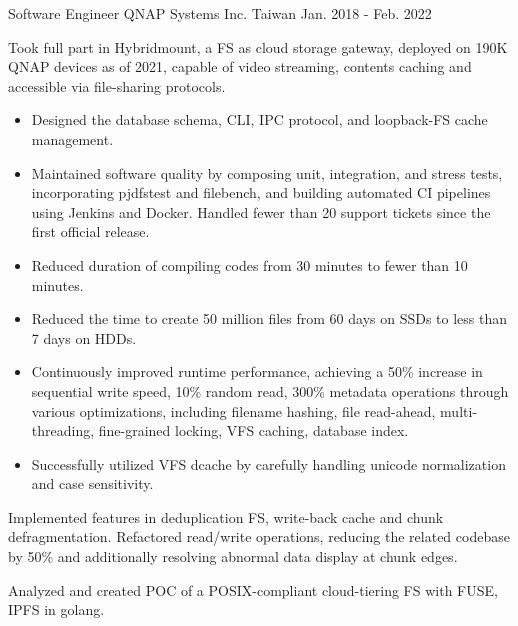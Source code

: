 \begin{cventries}
  \cventry
    {Software Engineer} %
    {QNAP Systems Inc.} %
    {Taiwan} %
    {Jan. 2018 - Feb. 2022} %
    {
      \begin{cvitems} %
        \item Took full part in Hybridmount, a FS as cloud storage gateway,
          deployed on 190K QNAP devices as of 2021, capable of video streaming,
          contents caching and accessible via file-sharing protocols.
        \begin{itemize}
          \item Designed the database schema, CLI, IPC protocol, and loopback-FS
            cache management.
          \item Maintained software quality by composing unit, integration, and
            stress tests, incorporating pjdfstest and filebench, and building
            automated CI pipelines using Jenkins and Docker. Handled fewer than
            20 support tickets since the first official release.
          \item Reduced duration of compiling codes from 30 minutes to fewer
            than 10 minutes.
          \item Reduced the time to create 50 million files from 60 days
            on SSDs to less than 7 days on HDDs.
          \item Continuously improved runtime performance, achieving a 50\%
            increase in sequential write speed, 10\% random read, 300\% metadata
            operations through various optimizations, including filename
            hashing, file read-ahead, multi-threading, fine-grained locking, VFS
            caching, database index.
          \item Successfully utilized VFS dcache by carefully handling unicode
            normalization and case sensitivity.
        \end{itemize}
        \item Implemented features in deduplication FS, write-back cache
          and chunk defragmentation. Refactored read/write operations, reducing
          the related codebase by 50\% and additionally resolving abnormal data
          display at chunk edges.
        \item Analyzed and created POC of a POSIX-compliant cloud-tiering FS
          with FUSE, IPFS in golang.
      \end{cvitems}
    }

\end{cventries}
